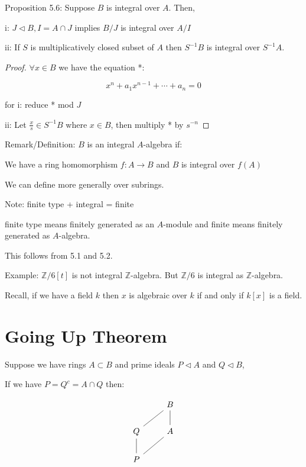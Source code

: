 \documentclass{article}
\theoremstyle{definition}
\begin{document}
Proposition 5.6: Suppose \(B\) is integral over \(A\). Then,

i: \(J \triangleleft B, I = A\cap J\) implies \(B / J\) is integral over \(A / I\) 

ii: If \(S\) is multiplicatively closed subset of \(A\) then \(S ^{-1} B\) is integral over \(S ^{-1} A\).

\begin{proof}
    \(\forall x\in B\)  we have the equation *:

    \[
        x^n  + a_1 x^{n-1} + \cdots + a_n = 0 
    \]

    for i: reduce * mod \(J\) 

    ii: Let \(\frac{x}{s}\in S ^{-1} B\) where \(x\in B\), then multiply * by \(s ^{-n} \)   

\end{proof}

Remark/Definition: \(B\) is an integral \(A\)-algebra if:

We have a ring homomorphism \(f:A \to B\) and \(B\) is integral over \(f(A)\)

We can define more generally over subrings.

Note: finite type + integral = finite

finite type means finitely generated as an \(A\)-module and finite means finitely generated as \(A\)-algebra.

This follows from 5.1 and 5.2.

Example: \(\mathbb{Z} / 6 [t]\) is not integral \(\mathbb{Z}\)-algebra. But \(\mathbb{Z} / 6\) is integral as \(\mathbb{Z}\)-algebra.

Recall, if we have a field \(k\) then \(x\) is algebraic over \(k\) if and only if \(k[x]\) is a field.

\section*{Going Up Theorem}

Suppose we have rings \(A \subset B\) and prime ideals \(P \triangleleft A\) and \(Q \triangleleft B\),

If we have \(P = Q^c = A \cap Q\) then:

\[
    \begin{tikzcd}
                           & B \ar[d, no head] \\
        Q \ar[d, no head] \ar[ru, no head] & A\\
        P \ar[ru, no head] & 
    \end{tikzcd}
\]
\end{document}
